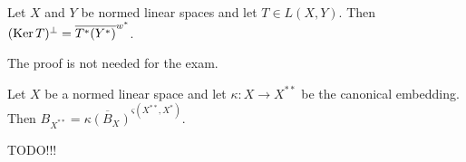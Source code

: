 \documentclass[12pt]{article}					%
\begin{document}
\begin{dusledek}
	Let $X$ and $Y$ be normed linear spaces and let $T \in L(X, Y)$. Then $(\operatorname{Ker} T)^\perp = \overline{T^*(Y^*)}^{w^*}$.

	\begin{dukazin}
		The proof is not needed for the exam.
	\end{dukazin}
\end{dusledek}

\begin{veta}[Goldstine]
	Let $X$ be a normed linear space and let $κ: X \rightarrow X^{**}$ be the canonical embedding. Then $B_{X^{**}} = \overline{κ(B_X)}^{ς(X^{**}, X^*)}$.

	\begin{dukazin}
		TODO!!!
	\end{dukazin}
\end{veta}
\end{document}
